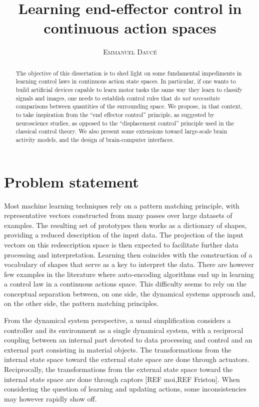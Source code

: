 \documentclass[11pt]{article}
\title{\Huge \textbf{Learning end-effector control in continuous action spaces} }
\author{\textsc{Emmanuel Daucé}}%
\begin{document}
\maketitle
\begin{abstract}




The objective  of this dissertation is to shed light on some fundamental impediments 
in learning control laws in continuous action state spaces. 
In particular, if one wants to build artificial devices capable to learn motor tasks
the same way they learn to classify signals and images, 
one needs to establish control rules that \textit{do not necessitate} comparisons between quantities
of the surrounding space.
We propose, in that context, to
take inspiration from the ``end effector control'' principle, as suggested by neuroscience studies,  
as opposed to the ``displacement control'' principle used in the classical control theory. 
We also present some extensions toward large-scale 
brain activity models, and the design of brain-computer interfaces.

\end{abstract}

\section{Problem statement}

Most machine learning techniques rely on a pattern matching principle, with representative vectors constructed from many passes over large datasets of examples.
The resulting set of prototypes then works as a dictionary of shapes, providing a reduced description of the input data. The projection of the input vectors on this redescription space is then expected to facilitate further data processing and interpretation.
Learning then coincides with the construction of a vocabulary of shapes that serve as a key to interpret the data. 
There are however few examples in the literature where auto-encoding algorithms end up in learning a control law in a continuous actions space.  
This difficulty seems to rely on the conceptual separation between, on one side, the dynamical systems approach and, on the other side, the pattern matching principles.

From the dynamical system perspective, a usual simplification considers a controller and its environment as a single dynamical system, with a reciprocal coupling between an internal part devoted to data processing and control and an external part consisting in material objects. The transformations from the internal state space toward the external state space are done through actuators. Reciprocally, the transformations from the external state space toward the internal state space are done through captors [REF moi,REF Friston]. 
When considering the question of learning and updating actions, some inconsistencies may however rapidly show off. 
\end{document}

